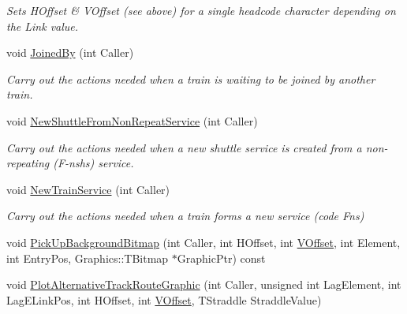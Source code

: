 \begin{DoxyCompactItemize}
\begin{DoxyCompactList}\small\item\em Sets H\+Offset \& V\+Offset (see above) for a single headcode character depending on the Link value. \end{DoxyCompactList}\item 
\mbox{\label{class_t_train_a6c3479378d35f9041c38d80f03686b41}} 
void \mbox{\hyperlink{class_t_train_a6c3479378d35f9041c38d80f03686b41}{Joined\+By}} (int Caller)
\begin{DoxyCompactList}\small\item\em Carry out the actions needed when a train is waiting to be joined by another train. \end{DoxyCompactList}\item 
\mbox{\label{class_t_train_a56fcfe4b9a3cef988bbeb4f4766372aa}} 
void \mbox{\hyperlink{class_t_train_a56fcfe4b9a3cef988bbeb4f4766372aa}{New\+Shuttle\+From\+Non\+Repeat\+Service}} (int Caller)
\begin{DoxyCompactList}\small\item\em Carry out the actions needed when a new shuttle service is created from a non-\/repeating (F-\/nshs) service. \end{DoxyCompactList}\item 
\mbox{\label{class_t_train_a75a2e9017b96e2a8f2a1edbd01c2cd68}} 
void \mbox{\hyperlink{class_t_train_a75a2e9017b96e2a8f2a1edbd01c2cd68}{New\+Train\+Service}} (int Caller)
\begin{DoxyCompactList}\small\item\em Carry out the actions needed when a train forms a new service (code Fns) \end{DoxyCompactList}\item 
void \mbox{\hyperlink{class_t_train_af92ae73f1be23475e7ae424306cd4866}{Pick\+Up\+Background\+Bitmap}} (int Caller, int H\+Offset, int \mbox{\hyperlink{class_t_train_a4c8b153a620229a3d9cc54f64ffa5f4a}{V\+Offset}}, int Element, int Entry\+Pos, Graphics\+::\+T\+Bitmap $\ast$Graphic\+Ptr) const
\item 
void \mbox{\hyperlink{class_t_train_aa21e18b3085773ca8351c446911611c1}{Plot\+Alternative\+Track\+Route\+Graphic}} (int Caller, unsigned int Lag\+Element, int Lag\+E\+Link\+Pos, int H\+Offset, int \mbox{\hyperlink{class_t_train_a4c8b153a620229a3d9cc54f64ffa5f4a}{V\+Offset}}, T\+Straddle Straddle\+Value)

\end{DoxyCompactItemize}
